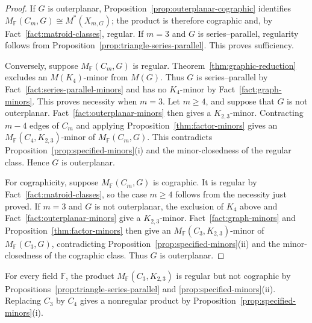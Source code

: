 \documentclass[12pt,a4paper]{article}
\numberwithin{equation}{section}
\newcommand{\F}{\mathbb F}
\theoremstyle{definition}
\theoremstyle{remark}
\begin{document}
\begin{proof}
If \(G\) is outerplanar, Proposition~\ref{prop:outerplanar-cographic} identifies
\(M_{\F}(C_m,G)\cong M^*(X_{m,G})\); the product is therefore cographic and,
by Fact~\ref{fact:matroid-classes}, regular.  If \(m=3\)
and \(G\) is series--parallel, regularity follows from
Proposition~\ref{prop:triangle-series-parallel}.  This proves sufficiency.

Conversely, suppose \(M_{\F}(C_m,G)\) is regular.
Theorem~\ref{thm:graphic-reduction} excludes an \(M(K_4)\)-minor
from \(M(G)\).  Thus \(G\) is series--parallel by
Fact~\ref{fact:series-parallel-minors} and has no \(K_4\)-minor by
Fact~\ref{fact:graph-minors}.  This proves necessity when \(m=3\).
Let \(m\ge4\), and suppose that \(G\) is not outerplanar.
Fact~\ref{fact:outerplanar-minors} then gives a \(K_{2,3}\)-minor.
Contracting \(m-4\) edges of \(C_m\) and applying
Proposition~\ref{thm:factor-minors} gives an
\(M_{\F}(C_4,K_{2,3})\)-minor of \(M_{\F}(C_m,G)\).
This contradicts Proposition~\ref{prop:specified-minors}\textup{(i)}
and the minor-closedness of the regular class.  Hence \(G\) is outerplanar.

For cographicity, suppose \(M_{\F}(C_m,G)\) is cographic.
It is regular by Fact~\ref{fact:matroid-classes}, so the case
\(m\ge4\) follows from the necessity just proved.  If \(m=3\)
and \(G\) is not outerplanar, the exclusion of \(K_4\) above
and Fact~\ref{fact:outerplanar-minors} give a \(K_{2,3}\)-minor.
Fact~\ref{fact:graph-minors} and
Proposition~\ref{thm:factor-minors} then give an
\(M_{\F}(C_3,K_{2,3})\)-minor of \(M_{\F}(C_3,G)\),
contradicting Proposition~\ref{prop:specified-minors}\textup{(ii)}
and the minor-closedness of the cographic class.  Thus \(G\) is outerplanar.
\end{proof}

For every field \(\F\), the product \(M_{\F}(C_3,K_{2,3})\) is
regular but not cographic by
Propositions~\ref{prop:triangle-series-parallel} and
\ref{prop:specified-minors}\textup{(ii)}.
Replacing \(C_3\) by \(C_4\) gives a nonregular product by
Proposition~\ref{prop:specified-minors}\textup{(i)}.
\end{document}
